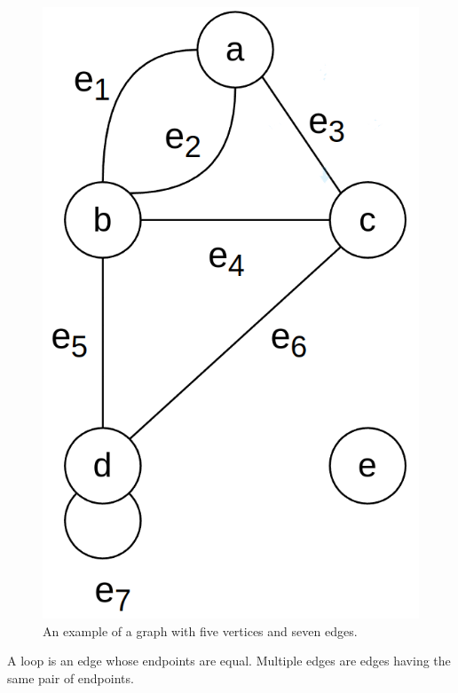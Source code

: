 \begin{figure}[H]
\begin{center}
\includegraphics[scale=0.2, keepaspectratio]{images/graph_example.png}
\end{center}
\caption{An example of a graph with five vertices and seven edges.}
\label{fig:graph_example}
\end{figure}

\begin{definition}
\label{def:multiedge_loop}
A loop is an edge whose endpoints are equal. Multiple edges are edges having the same pair of endpoints.
\end{definition}

